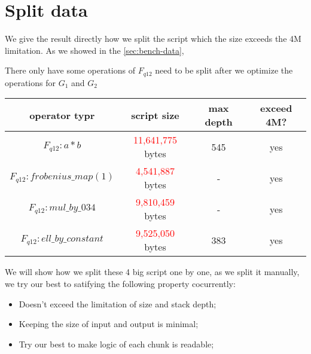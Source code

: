 \section{Split data} \label{sec:split-data}

We give the result directly how we split the script which the size exceeds the 4M limitation. As we showed in the \ref{sec:bench-data},

There only have some operations of $F_{q12}$ need to be split after we optimize the operations for $G_1$ and $G_2$

\begin{center}
\begin{tabular}{|c|c|c|c|} \hline
    operator typr & script size & max depth & exceed 4M? \\ \hline
    $F_{q12}: a * b$ & \textcolor{red}{11,641,775} bytes & 545 & yes \\ \hline
    $F_{q12}: frobenius\_map(1)$ & \textcolor{red}{4,541,887} bytes & - & yes \\ \hline
    $F_{q12}: mul\_by\_034$ & \textcolor{red}{9,810,459} bytes & - & yes \\ \hline
    $F_{q12}: ell\_by\_constant$ & \textcolor{red}{9,525,050} bytes & 383 & yes \\ \hline    
\end{tabular}
\end{center}


We will show how we split these 4 big script one by one, as we split it manually, we try our best to satifying the following property cocurrently:

\begin{itemize}
    \item Doesn't exceed the limitation of size and stack depth;
    \item Keeping the size of input and output is minimal;
    \item Try our best to make logic of each chunk is readable; 
\end{itemize}



